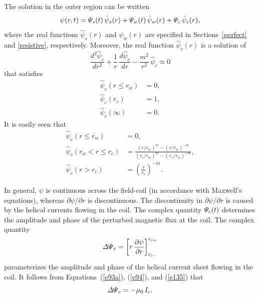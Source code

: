 \documentclass[notitlepage,12pt]{article}
\begin{document}
The solution in the outer region can be written
\begin{equation}
\psi(r,t) = {\mit\Psi}_s(t)\,\hat{\psi}_s(r) + {\mit\Psi}_w(t)\,\hat{\psi}_w(r) + {\mit\Psi}_c\,\hat{\psi}_c(r),
\end{equation}
where the real functions $\hat{\psi}_s(r)$ and $\hat{\psi}_w(r)$ are specified in Sections~\ref{perfect} and \ref{resistive}, respectively. 
Moreover, 
the real function  $\hat{\psi}_c(r)$ is a solution of 
\begin{equation}\label{e100b}
\frac{d^2\hat{\psi}_c}{dr^2} + \frac{1}{r}\,\frac{d\hat{\psi}_c}{dr}-\frac{m^2}{r^2}\,\hat{\psi}_c\simeq 0
\end{equation}
that satisfies
\begin{align}
\hat{\psi}_c(r\leq r_w) &= 0,\\[0.5ex]
\hat{\psi}_c(r_c) &= 1,\\[0.5ex]
\hat{\psi}_c(\infty) &= 0.
\end{align}
It is easily seen that
\begin{align}
\hat{\psi}_c(r\leq r_w) &= 0,\\[0.5ex]
\hat{\psi}_c(r_w<r \leq r_c) &= \frac{(r/r_w)^m-(r/r_w)^{-m}}{(r_c/r_w)^m - (r_c/r_w)^{-m}},\label{e142}\\[0.5ex]
\hat{\psi}_c(r> r_c) &=\left(\frac{r}{r_c}\right)^{-m}.\label{e143}
\end{align}

In general, $\psi$ is continuous across the field-coil (in accordance with Maxwell's equations), whereas $\partial\psi/\partial r$ is discontinuous. The discontinuity in $\partial\psi/\partial r$ is caused by the helical currents flowing in the coil. The complex quantity ${\mit\Psi}_c(t)$ determines the amplitude and
phase of the perturbed magnetic flux at the coil. The complex quantity
\begin{equation}\label{e118a}
{\mit\Delta\Psi}_c = \left[r\,\frac{\partial\psi}{\partial r}\right]_{r_{c-}}^{r_{c+}}
\end{equation}
parameterizes the amplitude and phase of the helical  current sheet flowing in the coil.
It follows from Equations~(\ref{e93a}), (\ref{e94}), and (\ref{e135})  that
\begin{equation}\label{e145}
{\mit\Delta\Psi}_c = -\mu_0\,I_c.
\end{equation}
\end{document}
